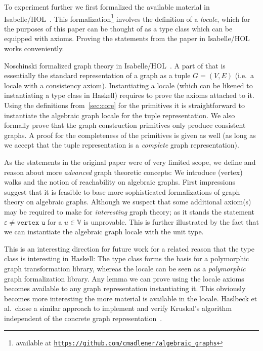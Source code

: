\documentclass{article}
\newcommand{\hs}{\texttt}
\renewcommand{\epsilon}{\varepsilon}
\newcommand{\eps}{\epsilon}
\begin{document}
To experiment further we first formalized the available material in
Isabelle/HOL~\cite{isabelle}.
This formalization\footnote{available at
  \texttt{\href{https://github.com/cmadlener/algebraic_graphs}{https://github.com/cmadlener/algebraic\_graphs}}}
involves the definition of a \textit{locale}, which for the
purposes of this paper can be thought of as a type class which can be equipped
with axioms. Proving the statements from the paper in Isabelle/HOL works
conveniently.

Noschinski formalized graph theory in
Isabelle/HOL~\cite{GraphTheory-AFP}. A part of that is essentially the standard
representation of a graph as a tuple $G=(V,E)$ (i.e.\ a locale with a
consistency axiom). Instantiating a locale (which can be likened to
instantiating a type class in Haskell) requires to prove the axioms attached to
it. Using the definitions from~\autoref{sec:core} for the primitives it is
straightforward to instantiate the algebraic graph locale for the tuple
representation. We also formally prove that the graph construction primitives only
produce consistent graphs. A proof for the completeness of the primitives is
given as well (as long as we accept that the tuple representation is a
\textit{complete} graph representation).

As the statements in the original paper were of very limited scope, we 
define and reason about more \textit{advanced} graph theoretic concepts: We
introduce (vertex) walks and the notion of reachability on algebraic graphs.
First impressions suggest that it is feasible to base more sophisticated
formalizations of graph theory on algebraic graphs. Although we suspect that
some additional axiom(s) may be required to make for \textit{interesting} graph
theory; as it stands the statement $\eps \neq \hs{vertex u}$ for a $u \in
\mathbb{V}$ is unprovable. This is further illustrated by the fact that we can
instantiate the algebraic graph locale with the unit type.

This is an interesting direction for future work for a related reason that the
type class is interesting in Haskell: The type class forms the basis for 
a polymorphic graph transformation library, whereas the locale can be
seen as a \textit{polymorphic} graph formalization library. Any lemma we can prove
using the locale axioms becomes available to any graph representation
instantiating it. This obviously becomes more interesting the more material is
available in the locale. Haslbeck et al.\ chose a similar approach to implement
and verify Kruskal's algorithm independent of the concrete graph
representation~\cite{Kruskal-AFP}.
\end{document}

